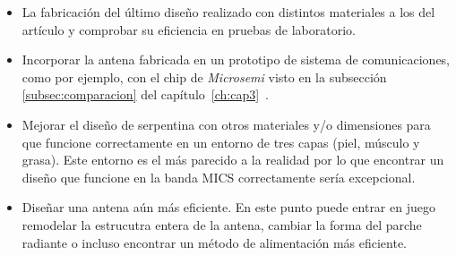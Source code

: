 \begin{itemize}
    \item La fabricación del último diseño realizado con distintos materiales a los del artículo y comprobar su eficiencia en pruebas de laboratorio.
    \item Incorporar la antena fabricada en un prototipo de sistema de comunicaciones, como por ejemplo, con el chip de \textit{Microsemi} visto en la subsección \ref{subsec:comparacion} del capítulo~\ref{ch:cap3}~\cite{zarlink}.
    \item Mejorar el diseño de serpentina con otros materiales y/o dimensiones para que funcione correctamente en un entorno de tres capas (piel, músculo y grasa). Este entorno es el más parecido a la realidad por lo que encontrar un diseño que funcione en la banda MICS correctamente sería excepcional.
    \item Diseñar una antena aún más eficiente. En este punto puede entrar en juego remodelar la estrucutra entera de la antena, cambiar la forma del parche radiante o incluso encontrar un método de alimentación más eficiente.
\end{itemize}

